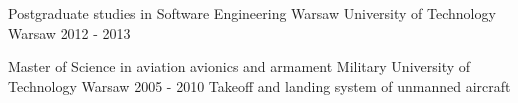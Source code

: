 

\begin{cventries}

  \cventry
    {Postgraduate studies in Software Engineering} %
    {Warsaw University of Technology} %
    {Warsaw} %
    {2012 - 2013} %
    {}

  \cventry
    {Master of Science in aviation avionics and armament} %
    {Military University of Technology}
    {Warsaw}
    {2005 - 2010}
    {Takeoff and landing system of unmanned aircraft}

\end{cventries}
